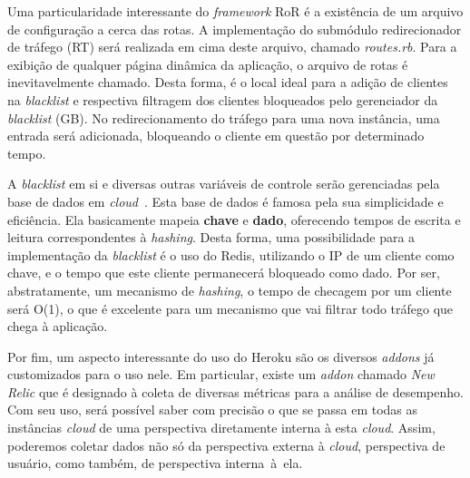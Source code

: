 Uma particularidade interessante do \emph{framework} RoR é a existência de um arquivo de configuração a cerca das rotas. A implementação do submódulo redirecionador de tráfego (RT) será realizada em cima deste arquivo, chamado \emph{routes.rb}. Para a exibição de qualquer página dinâmica da aplicação, o arquivo de rotas é inevitavelmente chamado. Desta forma, é o local ideal para a adição de clientes na \emph{blacklist} e respectiva filtragem dos clientes bloqueados pelo gerenciador da \emph{blacklist} (GB). No redirecionamento do tráfego para uma nova instância, uma entrada será adicionada, bloqueando o cliente em questão por determinado tempo.

A \emph{blacklist} em si e diversas outras variáveis de controle serão gerenciadas pela base de dados em \emph{cloud}~\cite{redis}. Esta base de dados é famosa pela sua simplicidade e eficiência. Ela basicamente mapeia \textbf{chave} e \textbf{dado}, oferecendo tempos de escrita e leitura correspondentes à \emph{hashing}. Desta forma, uma possibilidade para a implementação da \emph{blacklist} é o uso do Redis, utilizando o IP de um cliente como chave, e o tempo que este cliente permanecerá bloqueado como dado. Por ser, abstratamente, um mecanismo de \emph{hashing}, o tempo de checagem por um cliente será O(1), o que é excelente para um mecanismo que vai filtrar todo tráfego que chega à aplicação.

Por fim, um aspecto interessante do uso do Heroku são os diversos \emph{addons} já customizados para o uso nele. Em particular, existe um \emph{addon} chamado \emph{New Relic} que é designado à coleta de diversas métricas para a análise de desempenho. Com seu uso, será possível saber com precisão o que se passa em todas as instâncias \emph{cloud} de uma perspectiva diretamente interna à esta \emph{cloud}. Assim, poderemos coletar dados não só da perspectiva externa à \emph{cloud}, perspectiva de usuário, como também, de perspectiva interna~à~ela.